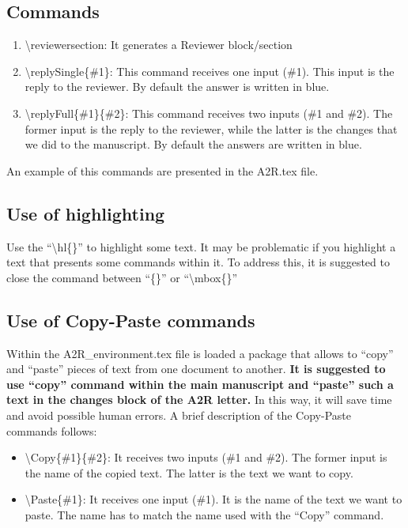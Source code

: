 \documentclass[./IEEE_Journal.tex]{subfiles}
\begin{document}
\subsection{Commands}
\begin{enumerate}
    \item \textbackslash reviewersection: It generates a Reviewer block/section
    \item \textbackslash replySingle\{\#1\}: This command receives one input (\#1). This input is the reply to the reviewer. By default the answer is written in blue. 
    \item \textbackslash replyFull\{\#1\}\{\#2\}: This command receives two inputs (\#1 and \#2). The former input is the reply to the reviewer, while the latter is the changes that we did to the manuscript. By default the answers are written in blue.
\end{enumerate}
An example of this commands are presented in the A2R.tex file.


\subsection{Use of highlighting}
Use the ``\textbackslash hl\{\}'' to highlight some text. 
It may be problematic if you highlight a text that presents some commands within it. To address this, it is suggested to close the command between ``\{\}'' or ``\textbackslash mbox\{\}'' 

\subsection{Use of Copy-Paste commands}
Within the A2R\_environment.tex file is loaded a package that allows to ``copy'' and ``paste'' pieces of text from one document to another.
\textbf{It is suggested to use ``copy'' command within the main manuscript and ``paste'' such a text in the changes block of the A2R letter.}
In this way, it will save time and avoid possible human errors.
A brief description of the Copy-Paste commands follows:
\begin{itemize}
    \item \textbackslash Copy\{\#1\}\{\#2\}: It receives two inputs (\#1 and \#2). The former input is the name of the copied text. The latter is the text we want to copy.
    \item \textbackslash Paste\{\#1\}: It receives one input (\#1). It is the name of the text we want to paste. The name has to match the name used with the ``Copy'' command.
\end{itemize}
\end{document}
